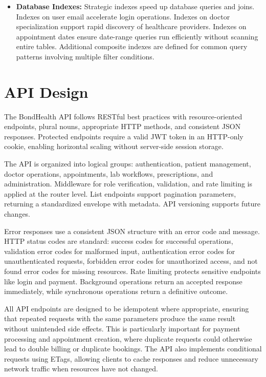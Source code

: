 \vspace{0.3cm}
\begin{itemize}
    \item \textbf{Database Indexes:} Strategic indexes speed up database queries and joins. Indexes on user email accelerate login operations. Indexes on doctor specialization support rapid discovery of healthcare providers. Indexes on appointment dates ensure date-range queries run efficiently without scanning entire tables. Additional composite indexes are defined for common query patterns involving multiple filter conditions.
\end{itemize}


\section{API Design}

\justifying
\noindent The BondHealth API follows RESTful best practices with resource-oriented endpoints, plural nouns, appropriate HTTP methods, and consistent JSON responses. Protected endpoints require a valid JWT token in an HTTP-only cookie, enabling horizontal scaling without server-side session storage.

\justifying
\noindent The API is organized into logical groups: authentication, patient management, doctor operations, appointments, lab workflows, prescriptions, and administration. Middleware for role verification, validation, and rate limiting is applied at the router level. List endpoints support pagination parameters, returning a standardized envelope with metadata. API versioning supports future changes.

\justifying
\noindent Error responses use a consistent JSON structure with an error code and message. HTTP status codes are standard: success codes for successful operations, validation error codes for malformed input, authentication error codes for unauthenticated requests, forbidden error codes for unauthorized access, and not found error codes for missing resources. Rate limiting protects sensitive endpoints like login and payment. Background operations return an accepted response immediately, while synchronous operations return a definitive outcome.

\justifying
\noindent All API endpoints are designed to be idempotent where appropriate, ensuring that repeated requests with the same parameters produce the same result without unintended side effects. This is particularly important for payment processing and appointment creation, where duplicate requests could otherwise lead to double billing or duplicate bookings. The API also implements conditional requests using ETags, allowing clients to cache responses and reduce unnecessary network traffic when resources have not changed.

